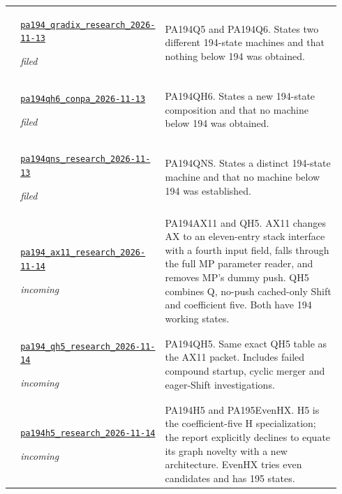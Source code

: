{\begin{longtable}{@{}>{\raggedright\arraybackslash}p{0.035\linewidth}>{\raggedright\arraybackslash}p{0.345\linewidth}>{\raggedright\arraybackslash}p{0.56\linewidth}@{}}
59 & \href{https://github.com/VladimirReshetnikov/ProveIt/blob/1c9524d8bf2e0a27b9a16ff622359927f536e663/Computability/BusyBeaver/Research/PA/docs/pa194_qradix_research_2026-11-13/README.md}{\nolinkurl{pa194_qradix_research_2026-11-13}}\par\emph{filed} & PA194Q5 and PA194Q6. States two different 194-state machines and that nothing below 194 was obtained.\\[4pt]
60 & \href{https://github.com/VladimirReshetnikov/ProveIt/blob/1c9524d8bf2e0a27b9a16ff622359927f536e663/Computability/BusyBeaver/Research/PA/docs/pa194qh6_conpa_2026-11-13/README.txt}{\nolinkurl{pa194qh6_conpa_2026-11-13}}\par\emph{filed} & PA194QH6. States a new 194-state composition and that no machine below 194 was obtained.\\[4pt]
61 & \href{https://github.com/VladimirReshetnikov/ProveIt/blob/1c9524d8bf2e0a27b9a16ff622359927f536e663/Computability/BusyBeaver/Research/PA/docs/pa194qns_research_2026-11-13/README.txt}{\nolinkurl{pa194qns_research_2026-11-13}}\par\emph{filed} & PA194QNS. States a distinct 194-state machine and that no machine below 194 was established.\\[4pt]
62 & \href{https://github.com/VladimirReshetnikov/ProveIt/blob/1c9524d8bf2e0a27b9a16ff622359927f536e663/docs/incoming/pa194_ax11_research_2026-11-14.zip}{\nolinkurl{pa194_ax11_research_2026-11-14}}\par\emph{incoming} & PA194AX11 and QH5. AX11 changes AX to an eleven-entry stack interface with a fourth input field, falls through the full MP parameter reader, and removes MP's dummy push. QH5 combines Q, no-push cached-only Shift and coefficient five. Both have 194 working states.\\[4pt]
63 & \href{https://github.com/VladimirReshetnikov/ProveIt/blob/1c9524d8bf2e0a27b9a16ff622359927f536e663/docs/incoming/pa194_qh5_research_2026-11-14.zip}{\nolinkurl{pa194_qh5_research_2026-11-14}}\par\emph{incoming} & PA194QH5. Same exact QH5 table as the AX11 packet. Includes failed compound startup, cyclic merger and eager-Shift investigations.\\[4pt]
64 & \href{https://github.com/VladimirReshetnikov/ProveIt/blob/1c9524d8bf2e0a27b9a16ff622359927f536e663/docs/incoming/pa194h5_research_2026-11-14.zip}{\nolinkurl{pa194h5_research_2026-11-14}}\par\emph{incoming} & PA194H5 and PA195EvenHX. H5 is the coefficient-five H specialization; the report explicitly declines to equate its graph novelty with a new architecture. EvenHX tries even candidates and has 195 states.\\[4pt]

\end{longtable}}
